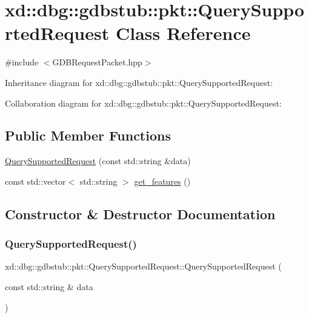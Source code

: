 \hypertarget{classxd_1_1dbg_1_1gdbstub_1_1pkt_1_1_query_supported_request}{}\section{xd\+:\+:dbg\+:\+:gdbstub\+:\+:pkt\+:\+:Query\+Supported\+Request Class Reference}
\label{classxd_1_1dbg_1_1gdbstub_1_1pkt_1_1_query_supported_request}


{\ttfamily \#include $<$G\+D\+B\+Request\+Packet.\+hpp$>$}



Inheritance diagram for xd\+:\+:dbg\+:\+:gdbstub\+:\+:pkt\+:\+:Query\+Supported\+Request\+:


Collaboration diagram for xd\+:\+:dbg\+:\+:gdbstub\+:\+:pkt\+:\+:Query\+Supported\+Request\+:
\subsection*{Public Member Functions}
\begin{DoxyCompactItemize}
\item 
\mbox{\hyperlink{classxd_1_1dbg_1_1gdbstub_1_1pkt_1_1_query_supported_request_a025057908b9448d106587cdc92ac093c}{Query\+Supported\+Request}} (const std\+::string \&data)
\item 
const std\+::vector$<$ std\+::string $>$ \mbox{\hyperlink{classxd_1_1dbg_1_1gdbstub_1_1pkt_1_1_query_supported_request_acad6e1b74f4e12041f00f5bf810127f8}{get\+\_\+features}} ()
\end{DoxyCompactItemize}


\subsection{Constructor \& Destructor Documentation}
\mbox{\label{classxd_1_1dbg_1_1gdbstub_1_1pkt_1_1_query_supported_request_a025057908b9448d106587cdc92ac093c}} 
\subsubsection{\texorpdfstring{Query\+Supported\+Request()}{QuerySupportedRequest()}}
{\footnotesize\ttfamily xd\+::dbg\+::gdbstub\+::pkt\+::\+Query\+Supported\+Request\+::\+Query\+Supported\+Request (\begin{DoxyParamCaption}\item[{const std\+::string \&}]{data }\end{DoxyParamCaption})\hspace{0.3cm}{\ttfamily [inline]}}



